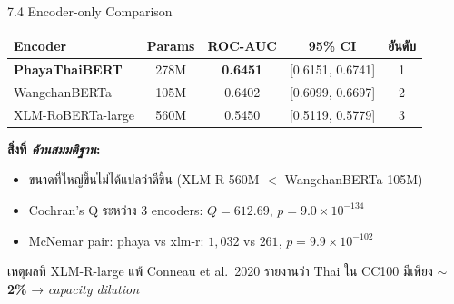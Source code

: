 \documentclass[aspectratio=169,11pt,xcolor=dvipsnames]{beamer}
\newcommand{\hl}[1]{\textcolor{kmitlOrange}{\textbf{#1}}}
\begin{document}
\begin{frame}{7.4 Encoder-only Comparison}
  \begin{center}
    \begin{tabular}{lcccc}
      \toprule
      \textbf{Encoder} & \textbf{Params} & \textbf{ROC-AUC} & \textbf{95\% CI} & \textbf{อันดับ}\\
      \midrule
      \hl{PhayaThaiBERT} & 278M & \textbf{0.6451} & [0.6151, 0.6741] & 1\\
      WangchanBERTa      & 105M & 0.6402 & [0.6099, 0.6697] & 2\\
      XLM-RoBERTa-large  & 560M & 0.5450 & [0.5119, 0.5779] & 3\\
      \bottomrule
    \end{tabular}
  \end{center}
  \vspace{0.5em}
  \textbf{สิ่งที่ \emph{ค้านสมมติฐาน}:}
  \begin{itemize}
    \item ขนาดที่ใหญ่ขึ้นไม่ได้แปลว่าดีขึ้น (XLM-R 560M $<$ WangchanBERTa 105M)
    \item Cochran's Q ระหว่าง 3 encoders: $Q = 612.69$, $p = 9.0 \times 10^{-134}$
    \item McNemar pair: phaya vs xlm-r: $1{,}032$ vs $261$, $p = 9.9 \times 10^{-102}$
  \end{itemize}
  \vspace{0.3em}
  \begin{block}{เหตุผลที่ XLM-R-large แพ้}
    Conneau et al.\ 2020 รายงานว่า Thai ใน CC100 มีเพียง \hl{$\sim$2\%} → \emph{capacity dilution}
  \end{block}
\end{frame}
\end{document}
